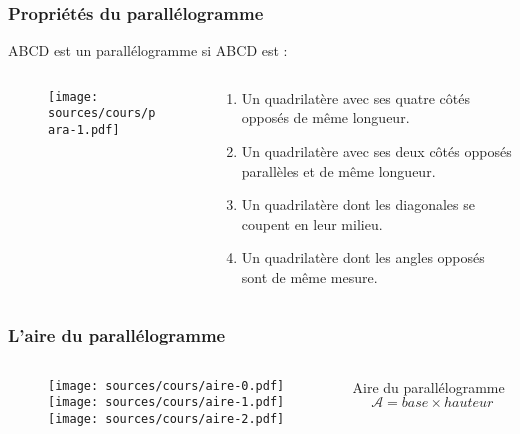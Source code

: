 \documentclass{beamer}
\begin{document}
\begin{frame}
  \frametitle{Propriétés du parallélogramme}
  \begin{block}{ABCD est un parallélogramme si ABCD est :}	

    \begin{columns}[t]
      \begin{column}{4cm}
        \begin{figure}[H]
          \centering
          \texttt{[image: sources/cours/para-1.pdf]}
        \end{figure}
      \end{column}
      \begin{column}{6cm}
        \begin{enumerate}
        \item<1-> Un quadrilatère avec ses quatre côtés opposés de même longueur.
        \item<2-> Un quadrilatère avec ses deux côtés opposés parallèles et de même longueur.
        \item<3-> Un quadrilatère dont les diagonales se coupent en leur milieu.
        \item<4> Un quadrilatère dont les angles opposés sont de même mesure.     
        \end{enumerate}
      \end{column}
    \end{columns} 
  \end{block}
\end{frame}

\begin{frame}
  \frametitle{L'aire du parallélogramme}

  \begin{columns}[t]
    \begin{column}{6cm}
      \begin{block}{}	
        \begin{figure}[H]
          \centering
          \texttt{[image: sources/cours/aire-0.pdf]} \\
          \texttt{[image: sources/cours/aire-1.pdf]} \\
          \texttt{[image: sources/cours/aire-2.pdf]}       
        \end{figure}
      \end{block}
    \end{column}
    \begin{column}{5.5cm}
      \vspace{2.5cm}
      \begin{alertblock}{Aire du parallélogramme}
        $$\mathcal{A} = base \times hauteur$$
      \end{alertblock}
      
    \end{column}
  \end{columns} 

\end{frame}
\end{document}
